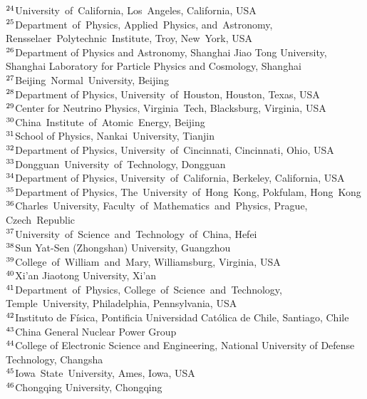 {$^{24}$University~of~California, Los~Angeles, California, USA \\ 
$^{25}$Department~of~Physics, Applied~Physics, and~Astronomy, Rensselaer~Polytechnic~Institute, Troy, New~York, USA \\ 
$^{26}$Department of Physics and Astronomy, Shanghai Jiao Tong University, Shanghai Laboratory for Particle Physics and Cosmology, Shanghai \\ 
$^{27}$Beijing~Normal~University, Beijing \\ 
$^{28}$Department of Physics, University~of~Houston, Houston, Texas, USA \\ 
$^{29}$Center for Neutrino Physics, Virginia~Tech, Blacksburg, Virginia, USA \\ 
$^{30}$China~Institute~of~Atomic~Energy, Beijing \\ 
$^{31}$School of Physics, Nankai~University, Tianjin \\ 
$^{32}$Department of Physics, University~of~Cincinnati, Cincinnati, Ohio, USA \\ 
$^{33}$Dongguan~University~of~Technology, Dongguan \\ 
$^{34}$Department of Physics, University~of~California, Berkeley, California, USA \\ 
$^{35}$Department of Physics, The~University~of~Hong~Kong, Pokfulam, Hong~Kong \\ 
$^{36}$Charles~University, Faculty~of~Mathematics~and~Physics, Prague, Czech~Republic \\ 
$^{37}$University~of~Science~and~Technology~of~China, Hefei \\ 
$^{38}$Sun Yat-Sen (Zhongshan) University, Guangzhou \\ 
$^{39}$College~of~William~and~Mary, Williamsburg, Virginia, USA \\ 
$^{40}$Xi'an Jiaotong University, Xi'an \\ 
$^{41}$Department~of~Physics, College~of~Science~and~Technology, Temple~University, Philadelphia, Pennsylvania, USA \\ 
$^{42}$Instituto de F\'isica, Pontificia Universidad Cat\'olica de Chile, Santiago, Chile \\ 
$^{43}$China General Nuclear Power Group \\ 
$^{44}$College of Electronic Science and Engineering, National University of Defense Technology, Changsha \\ 
$^{45}$Iowa~State~University, Ames, Iowa, USA \\ 
$^{46}$Chongqing University, Chongqing \\ 
} 
